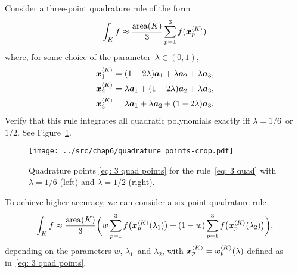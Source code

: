 \begin{Exercises}
\exercise
Consider a three-point quadrature rule of the form
\begin{equation}\label{eq: 3 quad}
\int_Kf\approx\frac{\mathrm{area}(K)}{3}\sum_{p=1}^3 
    f(\boldsymbol{x}^{\langle K\rangle}_p)
\end{equation}
where, for some choice of the parameter~$\lambda\in(0,1)$, 
\begin{equation}\label{eq: 3 quad points}
\begin{aligned}
\boldsymbol{x}^{\langle K\rangle}_1=(1-2\lambda)\boldsymbol{a}_1+\lambda\boldsymbol{a}_2
    +\lambda\boldsymbol{a}_3,\\
\boldsymbol{x}^{\langle K\rangle}_2=\lambda\boldsymbol{a}_1+(1-2\lambda)\boldsymbol{a}_2
    +\lambda\boldsymbol{a}_3,\\
\boldsymbol{x}^{\langle K\rangle}_3=\lambda\boldsymbol{a}_1+\lambda\boldsymbol{a}_2
    +(1-2\lambda)\boldsymbol{a}_3.
\end{aligned}
\end{equation}
Verify that this rule integrates all quadratic polynomials exactly iff
$\lambda=1/6$~or $1/2$.  See Figure~\ref{fig: quadrature points}.
\begin{figure}
\caption{Quadrature points \eqref{eq: 3 quad points} for the 
rule~\eqref{eq: 3 quad} with $\lambda=1/6$ (left) and $\lambda=1/2$ (right).}
\label{fig: quadrature points}
\begin{center}
\texttt{[image: ../src/chap6/quadrature\_points-crop.pdf]}
\end{center}
\end{figure}

\begin{exercise}
To achieve higher accuracy, we can consider a six-point quadrature rule
\[
\int_K f\approx\frac{\mathrm{area}(K)}{3}\biggl(
	w\sum_{p=1}^3 f\bigl(\boldsymbol{x}^{\langle K\rangle}_p(\lambda_1)\bigr)
	+(1-w)\sum_{p=1}^3 f\bigl(\boldsymbol{x}^{\langle K\rangle}_p(\lambda_2)\bigr)\biggr),
\]
depending on the parameters $w$, $\lambda_1$~and $\lambda_2$, with 
$\boldsymbol{x}^{\langle K\rangle}_p=\boldsymbol{x}^{\langle K\rangle}_p(\lambda)$ defined as 
in~\eqref{eq: 3 quad points}.
\end{exercise}


\end{Exercises}
